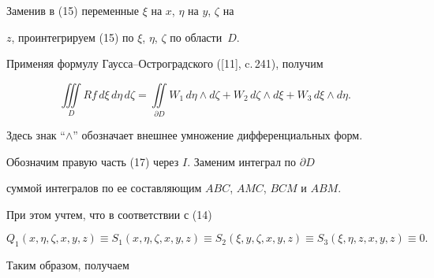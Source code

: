 Заменив в (15) переменные $\xi$ на $x$, $\eta$ на $y$, $\zeta$ на


$z$, проинтегрируем (15) по $\xi$, $\eta$, $\zeta$ по области~$D$.


Применяя формулу Гаусса--Остроградского ([11], c.\,241), получим


\begin{equation} %


\iiint\limits_{D} Rf\,d\xi\, d\eta\, d\zeta=


\iint\limits_{\partial D} W_1\, d\eta \wedge d\zeta


+W_2\, d\zeta \wedge d\xi+W_3\, d\xi \wedge d\eta.


\end{equation}


Здесь знак ``$\wedge$'' обозначает внешнее умножение дифференциальных форм.


Обозначим правую часть (17) через $I$. Заменим интеграл по $\partial D$


суммой интегралов по ее составляющим $ABC$, $AMC$, $BCM$ и $ABM$.


При этом учтем, что в соответствии с (14)


$$


Q_{1}(x,\eta,\zeta,x,y,z)\equiv S_{1}(x,\eta,\zeta,x,y,z)\equiv


S_{2}(\xi,y,\zeta,x,y,z)\equiv S_{3}(\xi,\eta,z,x,y,z)\equiv 0.


$$


Таким образом, получаем


